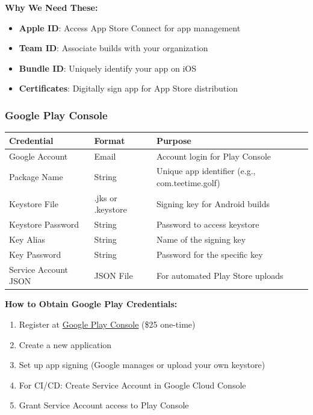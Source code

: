 \documentclass[11pt,a4paper]{article}
\begin{document}
\vspace{0.3cm}
\textbf{Why We Need These:}
\begin{itemize}[label=\faCheckCircle]
\item \textbf{Apple ID}: Access App Store Connect for app management
\item \textbf{Team ID}: Associate builds with your organization
\item \textbf{Bundle ID}: Uniquely identify your app on iOS
\item \textbf{Certificates}: Digitally sign app for App Store distribution
\end{itemize}


\subsubsection{Google Play Console}

\begin{tabularx}{\textwidth}{|p{4cm}|p{3cm}|Y|}
\hline
{}
\textbf{Credential} & \textbf{Format} & \textbf{Purpose} \\
\hline
Google Account & Email & Account login for Play Console \\
\hline
Package Name & String & Unique app identifier (e.g., com.teetime.golf) \\
\hline
Keystore File & .jks or .keystore & Signing key for Android builds \\
\hline
Keystore Password & String & Password to access keystore \\
\hline
Key Alias & String & Name of the signing key \\
\hline
Key Password & String & Password for the specific key \\
\hline
Service Account JSON & JSON File & For automated Play Store uploads \\
\hline
\end{tabularx}

\vspace{0.3cm}
\textbf{How to Obtain Google Play Credentials:}
\begin{enumerate}[label=\arabic*.]
\item Register at \href{https://play.google.com/console}{Google Play Console} (\$25 one-time)
\item Create a new application
\item Set up app signing (Google manages or upload your own keystore)
\item For CI/CD: Create Service Account in Google Cloud Console
\item Grant Service Account access to Play Console
\end{enumerate}
\end{document}
